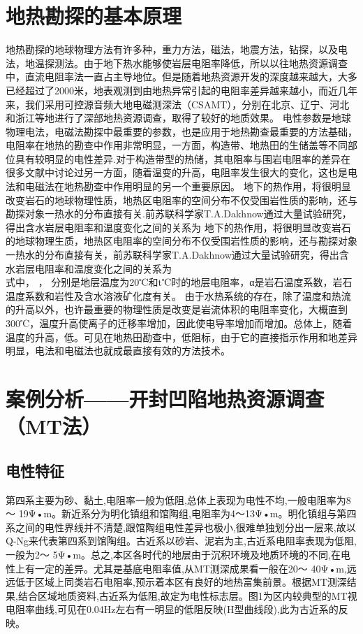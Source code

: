 \documentclass[lang=cn,11pt]{elegantpaper}
\begin{document}
\section{地热勘探的基本原理}
地热勘探的地球物理方法有许多种，重力方法，磁法，地震方法，钻探，以及电法，地温探测法。由于地下热水能够使岩层电阻率降低，所以以往地热资源调查中，直流电阻率法一直占主导地位。但是随着地热资源开发的深度越来越大，大多已经超过了2000米，地表观测到由地热异常引起的电阻率差异越来越小，而近几年来，我们采用可控源音频大地电磁测深法（CSAMT），分别在北京、辽宁、河北和浙江等地进行了深部地热资源调查，取得了较好的地质效果。
电性参数是地球物理电法，电磁法勘探中最重要的参数，也是应用于地热勘查最重要的方法基础，电阻率在地热的勘查中作用非常明显，一方面，构造带、地热田的生储盖等不同部位具有较明显的电性差异.对于构造带型的热储，其电阻率与围岩电阻率的差异在很多文献中讨论过另一方面，随着温变的升高，电阻率发生很大的变化，这也是电法和电磁法在地热勘查中作用明显的另一个重要原因。
地下的热作用，将很明显改变岩石的地球物理性质，地热区电阻率的空间分布不仅受围岩性质的影响，还与勘探对象一热水的分布直接有关.前苏联科学家T.A.Dakhnow通过大量试验研究，得出含水岩层电阻率和温度变化之间的关系为
地下的热作用，将很明显改变岩石的地球物理生质，地热区电阻率的空间分布不仅受围岩性质的影响，还与勘探对象一热水的分布直接有关，前苏联科学家T.A.Dakhnow通过大量试验研究，得出含水岩层电阻率和温度变化之间的关系为\\
式中， ， 分别是地层温度为20℃和t℃时的地层电阻率，α是岩石温度系数，岩石温度系数和岩性及含水溶液矿化度有关。	
由于水热系统的存在，除了温度和热流的升高以外，也许最重要的物理性质是改变是岩流体积的电阻率变化，大概直到300℃，温度升高使离子的迁移率增加，因此使电导率增加而增加。总体上，随着温度的升高，低。可见在地热田勘查中，低阻标，由于它的直接指示作用和地差异明显，电法和电磁法也就成最直接有效的方法技术。


\section{案例分析——开封凹陷地热资源调查（MT法）}
    \subsection{电性特征}
    第四系主要为砂、黏土,电阻率一般为低阻,总体上表现为电性不均,一般电阻率为8～ 19Ψ•m。新近系分为明化镇组和馆陶组,电阻率为4～13Ψ•m。明化镇组与第四系之间的电性界线并不清楚,跟馆陶组电性差异也极小,很难单独划分出一层来,故以Q-Ng来代表第四系到馆陶组。古近系以砂岩、泥岩为主,古近系电阻率表现为低阻,一般为2～ 5Ψ•m。总之,本区各时代的地层由于沉积环境及地质环境的不同,在电性上有一定的差异。尤其是基底电阻率值,从MT测深成果看一般在20～ 40Ψ•m,远远低于区域上同类岩石电阻率,预示着本区有良好的地热富集前景。根据MT测深结果,结合区域地质资料,古近系为低阻,故定为电性标志层。图1为区内较典型的MT视电阻率曲线,可见在0.04Hz左右有一明显的低阻反映(H型曲线段),此为古近系的反映。
\end{document}
